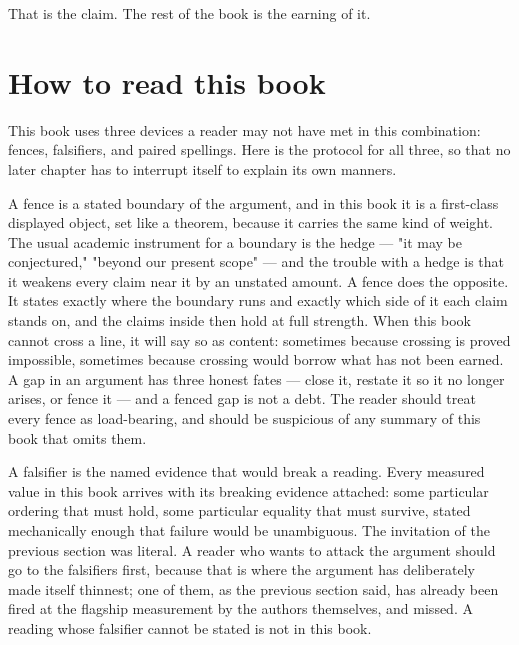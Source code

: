 That is the claim. The rest of the book is the earning of it.

\section{How to read this book}

This book uses three devices a reader may not have met in this combination: fences,
falsifiers, and paired spellings. Here is the protocol for all three, so that no later
chapter has to interrupt itself to explain its own manners.

A fence is a stated boundary of the argument, and in this book it is a first-class
displayed object, set like a theorem, because it carries the same kind of weight. The
usual academic instrument for a boundary is the hedge --- "it may be conjectured,"
"beyond our present scope" --- and the trouble with a hedge is that it weakens every
claim near it by an unstated amount. A fence does the opposite. It states exactly where
the boundary runs and exactly which side of it each claim stands on, and the claims
inside then hold at full strength. When this book cannot cross a line, it will say so as
content: sometimes because crossing is proved impossible, sometimes because crossing
would borrow what has not been earned. A gap in an argument has three honest fates ---
close it, restate it so it no longer arises, or fence it --- and a fenced gap is not a
debt. The reader should treat every fence as load-bearing, and should be suspicious of
any summary of this book that omits them.

A falsifier is the named evidence that would break a reading. Every measured value in
this book arrives with its breaking evidence attached: some particular ordering that
must hold, some particular equality that must survive, stated mechanically enough that
failure would be unambiguous. The invitation of the previous section was literal. A
reader who wants to attack the argument should go to the falsifiers first, because that
is where the argument has deliberately made itself thinnest; one of them, as the
previous section said, has already been fired at the flagship measurement by the authors
themselves, and missed. A reading whose falsifier cannot be stated is not in this book.

